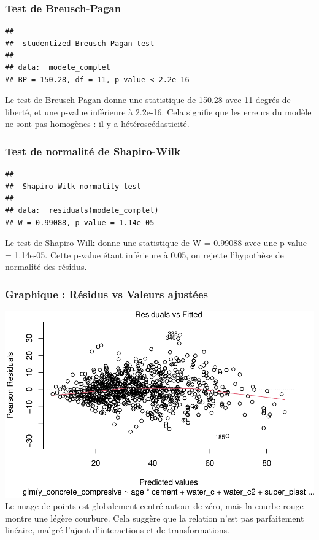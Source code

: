 \documentclass[
  12pt,
]{article}
\begin{document}
\subsubsection{Test de Breusch-Pagan}\label{test-de-breusch-pagan}

\begin{verbatim}
## 
##  studentized Breusch-Pagan test
## 
## data:  modele_complet
## BP = 150.28, df = 11, p-value < 2.2e-16
\end{verbatim}

Le test de Breusch-Pagan donne une statistique de 150.28 avec 11 degrés
de liberté, et une p-value inférieure à 2.2e-16. Cela signifie que les
erreurs du modèle ne sont pas homogènes : il y a hétéroscédasticité.

\subsubsection{Test de normalité de
Shapiro-Wilk}\label{test-de-normalituxe9-de-shapiro-wilk}

\begin{verbatim}
## 
##  Shapiro-Wilk normality test
## 
## data:  residuals(modele_complet)
## W = 0.99088, p-value = 1.14e-05
\end{verbatim}

Le test de Shapiro-Wilk donne une statistique de W = 0.99088 avec une
p-value = 1.14e-05. Cette p-value étant inférieure à 0.05, on rejette
l'hypothèse de normalité des résidus.

\subsubsection{Graphique : Résidus vs Valeurs
ajustées}\label{graphique-ruxe9sidus-vs-valeurs-ajustuxe9es}

\includegraphics{rmd_final_files/figure-latex/unnamed-chunk-60-1.pdf} Le
nuage de points est globalement centré autour de zéro, mais la courbe
rouge montre une légère courbure. Cela suggère que la relation n'est pas
parfaitement linéaire, malgré l'ajout d'interactions et de
transformations.
\end{document}
